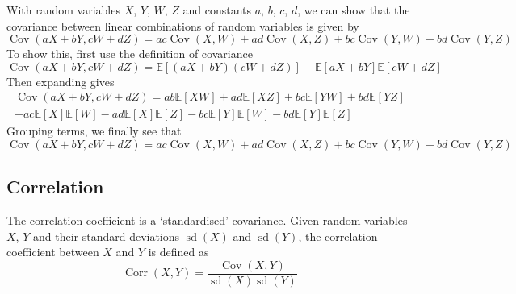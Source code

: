 \documentclass[11pt]{report} %
\begin{document}
With random variables $X$, $Y$, $W$, $Z$ and constants $a$, $b$, $c$, $d$, we can show that the covariance between linear combinations of random variables is given by
\begin{equation}
\operatorname{Cov}\left(aX+bY,cW+dZ\right)=ac\operatorname{Cov}\left(X,W\right)+ad\operatorname{Cov}\left(X,Z\right)+bc\operatorname{Cov}\left(Y,W\right)+bd\operatorname{Cov}\left(Y,Z\right)
\end{equation}
To show this, first use the definition of covariance
\begin{equation}
\operatorname{Cov}\left(aX+bY,cW+dZ\right)=\mathbb{E}\left[\left(aX+bY\right)\left(cW+dZ\right)\right]-\mathbb{E}\left[aX+bY\right]\mathbb{E}\left[cW+dZ\right]
\end{equation}
Then expanding gives
\begin{multline}
\operatorname{Cov}\left(aX+bY,cW+dZ\right) = ab\mathbb{E}\left[XW\right]+ad\mathbb{E}\left[XZ\right]+bc\mathbb{E}\left[YW\right]+bd\mathbb{E}\left[YZ\right] \\
-ac\mathbb{E}\left[X\right]\mathbb{E}\left[W\right]-ad\mathbb{E}\left[X\right]\mathbb{E}\left[Z\right]-bc\mathbb{E}\left[Y\right]\mathbb{E}\left[W\right]-bd\mathbb{E}\left[Y\right]\mathbb{E}\left[Z\right]
\end{multline}
Grouping terms, we finally see that
\begin{equation}
\operatorname{Cov}\left(aX+bY,cW+dZ\right)=ac\operatorname{Cov}\left(X,W\right)+ad\operatorname{Cov}\left(X,Z\right)+bc\operatorname{Cov}\left(Y,W\right)+bd\operatorname{Cov}\left(Y,Z\right)
\end{equation}

\subsection{Correlation}

The correlation coefficient is a `standardised' covariance. Given random variables $X$, $Y$ and their standard deviations $\operatorname{sd}\left(X\right)$ and $\operatorname{sd}\left(Y\right)$, the correlation coefficient between $X$ and $Y$ is defined as
\begin{equation}
\operatorname{Corr}\left(X, Y\right) = \dfrac{\operatorname{Cov}\left(X, Y\right)}{\operatorname{sd}\left(X\right)\operatorname{sd}\left(Y\right)}
\end{equation}
\end{document}
